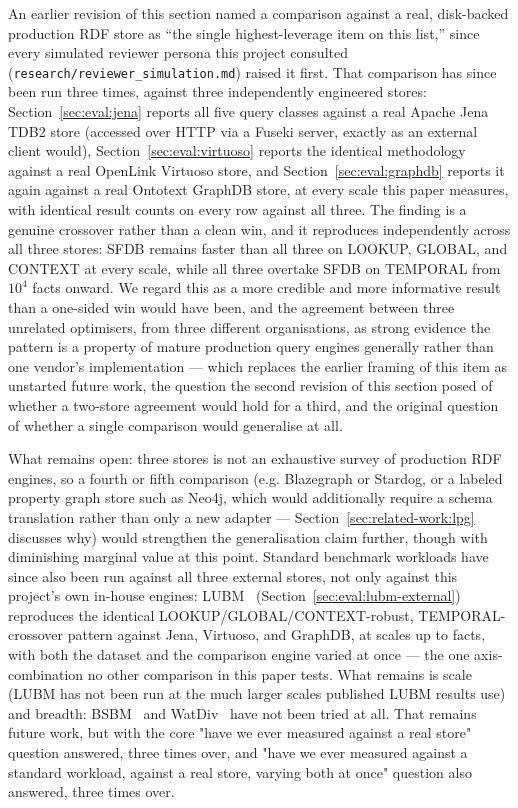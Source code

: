 An earlier revision of this section named a comparison against a real,
disk-backed production RDF store as ``the single highest-leverage item
on this list,'' since every simulated reviewer persona this project
consulted (\texttt{research/reviewer\_simulation.md}) raised it first.
That comparison has since been run three times, against three
independently
engineered stores: Section~\ref{sec:eval:jena} reports
all five query classes against a real Apache Jena TDB2 store (accessed
over HTTP via a Fuseki server, exactly as an external client would),
Section~\ref{sec:eval:virtuoso} reports the identical methodology
against a real OpenLink Virtuoso store, and Section~\ref{sec:eval:graphdb}
reports it again against a real Ontotext GraphDB store, at
every scale this paper measures, with identical result counts on every
row against all three. The finding is a genuine crossover rather than a clean
win, and it reproduces independently across all three stores: SFDB
remains faster than all three on LOOKUP, GLOBAL, and CONTEXT at every scale, while all
three overtake SFDB on TEMPORAL from $10^4$ facts onward. We
regard this as a more credible and more informative result than a
one-sided win would have been, and the agreement between three unrelated
optimisers, from three different organisations, as strong evidence the pattern is a
property of mature production query engines generally rather than one vendor's
implementation --- which replaces the earlier framing of
this item as unstarted future work, the question the second revision of
this section posed of whether a two-store agreement would hold for a
third, and the original question of whether a single comparison would
generalise at all.

What remains open: three stores is not an exhaustive survey of
production RDF engines, so a fourth or fifth comparison (e.g. Blazegraph
or Stardog, or a labeled property graph store such as Neo4j, which
would additionally require a schema translation rather than only a new
adapter --- Section~\ref{sec:related-work:lpg} discusses why) would
strengthen the generalisation claim further, though
with diminishing marginal value at this point. Standard benchmark
workloads have since also been run against all three external stores,
not only against this project's own in-house engines: LUBM~\cite{guo2005lubm}
(Section~\ref{sec:eval:lubm-external}) reproduces the identical
LOOKUP/GLOBAL/CONTEXT-robust, TEMPORAL-crossover pattern against Jena,
Virtuoso, and GraphDB, at scales up to \lubmjenalargescale{} facts, with
both the dataset and the comparison engine varied at once --- the one
axis-combination no other comparison in this paper tests. What remains
is scale (LUBM has not been run at the much larger scales published LUBM
results use) and breadth: BSBM~\cite{bizer2009bsbm} and
WatDiv~\cite{aluc2014watdiv} have not been tried at all.
That remains future work, but with the core "have we ever measured
against a real store" question answered, three times over, and "have we
ever measured against a standard workload, against a real store, varying
both at once" question also answered, three times over.

